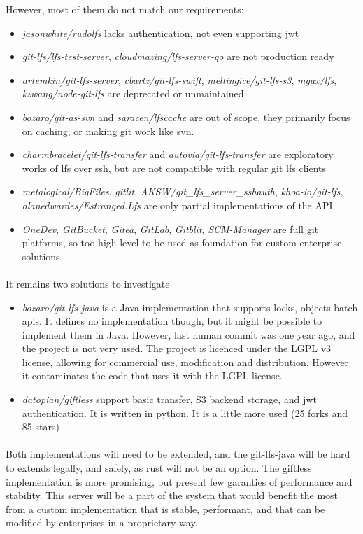However, most of them do not match our requirements:

\begin{itemize}
    \item \textit{jasonwhite/rudolfs} lacks authentication, not even supporting jwt
    \item \textit{git-lfs/lfs-test-server}, \textit{cloudmazing/lfs-server-go} are not production ready
    \item \textit{artemkin/git-lfs-server}, \textit{cbartz/git-lfs-swift}, \textit{meltingice/git-lfs-s3}, \textit{mgax/lfs}, \textit{kzwang/node-git-lfs} are deprecated or unmaintained
    \item \textit{bozaro/git-as-svn} and \textit{saracen/lfscache} are out of scope, they primarily focus on caching, or making git work like svn. 
    \item \textit{charmbracelet/git-lfs-transfer} and \textit{autovia/git-lfs-transfer} are exploratory works of lfs over ssh, but are not compatible with regular git lfs clients
    \item \textit{metalogical/BigFiles}, \textit{gitlit}, \textit{AKSW/git\_lfs\_server\_sshauth}, \textit{khoa-io/git-lfs}, \textit{alanedwardes/Estranged.Lfs} are only partial implementations of the API
    \item \textit{OneDev}, \textit{GitBucket}, \textit{Gitea}, \textit{GitLab}, \textit{Gitblit}, \textit{SCM-Manager} are full git platforms, so too high level to be used as foundation for custom enterprise solutions
\end{itemize}

\paragraph{}
It remains two solutions to investigate

\begin{itemize}
    \item \textit{bozaro/git-lfs-java} is a Java implementation that supports locks, objects batch apis. It defines no implementation though, but it might be possible to implement them in Java. However, last human commit was one year ago, and the project is not very used. The project is licenced under the LGPL v3 license, allowing for commercial use, modification and distribution. However it contaminates the code that uses it with the LGPL license.
    \item \textit{datopian/giftless} support basic transfer, S3 backend storage, and jwt authentication. It is written in python. It is a little more used (25 forks and 85 stars)
\end{itemize}

\paragraph{}
Both implementations will need to be extended, and the git-lfs-java will be hard to extends legally, and safely, as rust will not be an option. The giftless implementation is more promising, but present few garanties of performance and stability. This server will be a part of the system that would benefit the most from a custom implementation that is stable, performant, and that can be modified by enterprises in a proprietary way.
